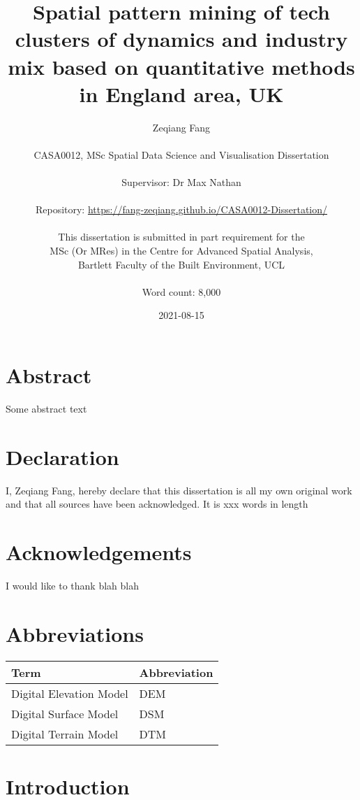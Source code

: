 \documentclass[
  12pt,
  oneside]{book}
\title{Spatial pattern mining of tech clusters of dynamics and industry mix based on quantitative methods in England area, UK}
\author{Zeqiang Fang\\
~\\
CASA0012, MSc Spatial Data Science and Visualisation Dissertation\\
~\\
Supervisor: Dr Max Nathan\\
~\\
Repository: \url{https://fang-zeqiang.github.io/CASA0012-Dissertation/}\\
~\\
This dissertation is submitted in part requirement for the\\
MSc (Or MRes) in the Centre for Advanced Spatial Analysis,\\
Bartlett Faculty of the Built Environment, UCL\\
~\\
Word count: 8,000}
\date{2021-08-15}
\begin{document}
\maketitle


\hypertarget{abstract}{%
\chapter*{Abstract}\label{abstract}}

Some abstract text


\hypertarget{declaration}{%
\chapter*{Declaration}\label{declaration}}

I, Zeqiang Fang, hereby declare that this dissertation is all my own original work and that all sources have been acknowledged. It is xxx words in length

\hypertarget{acknowledgements}{%
\chapter*{Acknowledgements}\label{acknowledgements}}

I would like to thank blah blah

\setcounter{tocdepth}{3}
\tableofcontents
\listoffigures
\listoftables

\hypertarget{abbreviations}{%
\chapter*{Abbreviations}\label{abbreviations}}

\begin{table}
\centering
\begin{tabular}{ll}
\toprule
\textbf{Term} & \textbf{Abbreviation}\\
\midrule
Digital Elevation Model & DEM\\
Digital Surface Model & DSM\\
Digital Terrain Model & DTM\\
\bottomrule
\end{tabular}
\end{table}

\hypertarget{introduction}{%
\chapter{Introduction}\label{introduction}}
\end{document}
